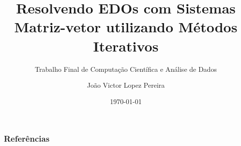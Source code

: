 \documentclass[10pt]{beamer}
\title{Resolvendo EDOs com Sistemas Matriz-vetor utilizando Métodos Iterativos}
\subtitle{Trabalho Final de Computação Científica e Análise de Dados}
\author{João Victor Lopez Pereira}
\institute{Instituto de Computação -- UFRJ}
\date{\today}
\begin{document}
  \frame{\titlepage}

  

  \begin{frame}
    \frametitle{Referências}
    \nocite{*}
    \printbibliography
  \end{frame}
\end{document}

